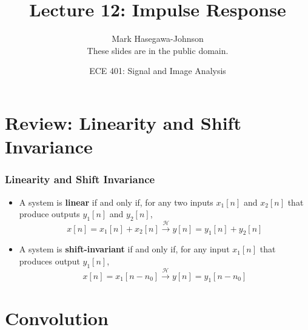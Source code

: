 \documentclass{beamer}
\title{Lecture 12: Impulse Response}
\author{Mark Hasegawa-Johnson\\These slides are in the public domain.}
\date{ECE 401: Signal and Image Analysis}
\begin{document}
\begin{frame}
  \maketitle
\end{frame}

\begin{frame}
  \tableofcontents
\end{frame}

\section[Review]{Review: Linearity and Shift Invariance}
\setcounter{subsection}{1}


\begin{frame}
  \frametitle{Linearity and Shift Invariance}
  \begin{itemize}
  \item A system is {\bf linear} if and only if, for any two inputs
    $x_1[n]$ and $x_2[n]$ that produce outputs $y_1[n]$ and $y_2[n]$,
    \[
    x[n]=x_1[n]+x_2[n] \stackrel{\mathcal H}{\longrightarrow}  y[n]=y_1[n]+y_2[n]
    \]
  \item A system is {\bf shift-invariant} if and only if, for any input
    $x_1[n]$ that produces output $y_1[n]$,
    \[
    x[n]=x_1[n-n_0] \stackrel{\mathcal H}{\longrightarrow}  y[n]=y_1[n-n_0]
    \]
  \end{itemize}
\end{frame}


\section[Convolution]{Convolution}
\setcounter{subsection}{1}
\end{document}
